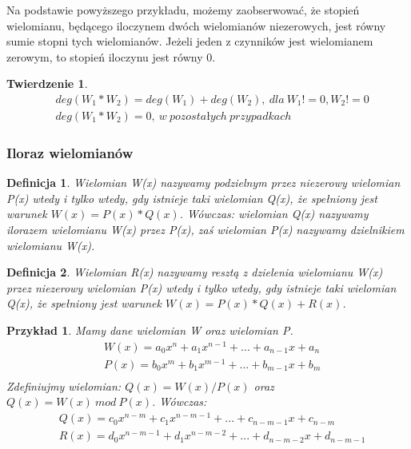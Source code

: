 \documentclass[twoside,a4paper]{book}
\newtheorem{theorem}{Twierdzenie}
\newtheorem{definition}{Definicja}
\newtheorem{example}{Przykład}
\begin{document}
Na podstawie powyższego przykładu, możemy zaobserwować, że stopień wielomianu, będącego iloczynem dwóch wielomianów niezerowych, jest równy sumie stopni tych wielomianów. Jeżeli jeden z czynników jest wielomianem zerowym, to stopień iloczynu jest równy 0.

\begin{theorem}
	\begin{equation}
	\begin{split}
	&deg(W_1 * W_2) = deg(W_1) + deg(W_2),\ dla\ W_1 != 0, W_2 != 0 \\
	&deg(W_1 * W_2) = 0,\ w \ pozostałych\ przypadkach
	\end{split}
	\end{equation}
\end{theorem}

\subsubsection{Iloraz wielomianów}

\begin{definition}
	Wielomian W(x) nazywamy podzielnym przez niezerowy wielomian P(x) wtedy i tylko wtedy, gdy istnieje taki wielomian Q(x), że spełniony jest warunek $W(x) = P(x) * Q(x)$. Wówczas: wielomian Q(x) nazywamy ilorazem wielomianu W(x) przez P(x), zaś wielomian P(x) nazywamy dzielnikiem wielomianu W(x).
\end{definition}

\begin{definition}
	Wielomian R(x) nazywamy resztą z dzielenia wielomianu W(x) przez niezerowy wielomian P(x) wtedy i tylko wtedy, gdy istnieje taki wielomian Q(x), że spełniony jest warunek $W(x) = P(x) * Q(x) + R(x)$.
\end{definition}

\begin{example}
	Mamy dane wielomian W oraz wielomian P.
	\begin{equation}
		\begin{split}
			&W(x) = a_0x^n + a_1x^{n-1} + ... + a_{n-1}x + a_n \\
			&P(x) = b_0x^m + b_1x^{m-1} + ... + b_{m-1}x + b_m \\
		\end{split}
	\end{equation}
	Zdefiniujmy wielomian: $Q(x) = W(x) / P(x)$ oraz $Q(x) = W(x)\ mod\ P(x)$. Wówczas:
	\begin{equation}
		\begin{split}
			&Q(x) = c_0x^{n-m} + c_1x^{n-m-1} + ... + c_{n-m-1}x + c_{n-m} \\
			&R(x) = d_0x^{n-m-1} + d_1x^{n-m-2} + ... + d_{n-m-2}x + d_{n-m-1} \\
		\end{split}
	\end{equation}
\end{example}
\end{document}
